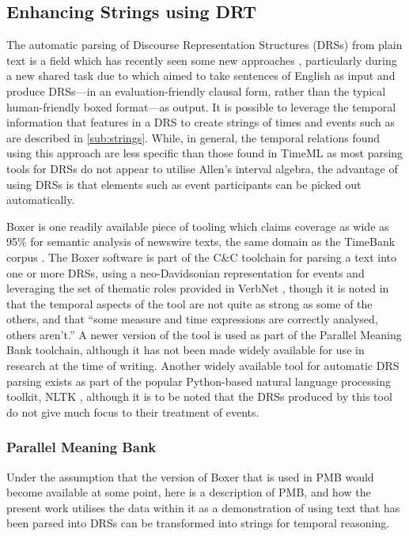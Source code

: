 \documentclass[a4paper,12pt,leqno]{article}
\begin{document}
\subsection{Enhancing Strings using DRT}\label{sub:enhancing}
The automatic parsing of Discourse Representation Structures (DRSs) from plain text is a field which has recently seen some new approaches \citep{ababzianidze2017parallel,van-noord-etal-2018-exploring}, particularly during a new shared task due to \citet{abzianidze2019first} which aimed to take sentences of English as input and produce DRSs---in an evaluation-friendly clausal form, rather than the typical human-friendly boxed format---as output. It is possible to leverage the temporal information that features in a DRS to create strings of times and events such as are described in \cref{sub:strings}. While, in general, the temporal relations found using this approach are less specific than those found in TimeML as most parsing tools for DRSs do not appear to utilise Allen's interval algebra, the advantage of using DRSs is that elements such as event participants can be picked out automatically.

Boxer \citep{Bos2008} is one readily available piece of tooling which claims coverage as wide as 95\% for semantic analysis of newswire texts, the same domain as the TimeBank corpus \citep{pustejovsky2006timebank}. The Boxer software is part of the C\&C toolchain \citep{curran2007linguistically} for parsing a text into one or more DRSs, using a neo-Davidsonian representation for events and leveraging the set of thematic roles provided in VerbNet \citep{schuler2005verbnet}, though it is noted in \citet[p. 277]{Bos2008} that the temporal aspects of the tool are not quite as strong as some of the others, and that ``some measure and time expressions are correctly analysed, others aren't.'' A newer version of the tool is used as part of the Parallel Meaning Bank \citep{abzianidze2017parallel} toolchain, although it has not been made widely available for use in research at the time of writing. Another widely available tool for automatic DRS parsing exists as part of the popular Python-based natural language processing toolkit, NLTK \citep{Bird2009}, although it is to be noted that the DRSs produced by this tool do not give much focus to their treatment of events.

\subsubsection{Parallel Meaning Bank}\label{ssub:pmb}
Under the assumption that the version of Boxer that is used in PMB would become available at some point, here is a description of PMB, and how the present work utilises the data within it as a demonstration of using text that has been parsed into DRSs can be transformed into strings for temporal reasoning.
\end{document}
